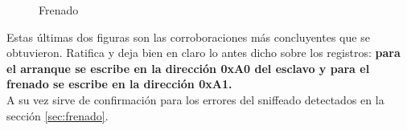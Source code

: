 \documentclass[main]{subfiles}
\begin{document}
\begin{figure} [h!]
\centering
  \caption{Frenado}
  \label{fig:MSP_frenado}
\end{figure}

Estas \'ultimas dos figuras son las corroboraciones m\'as concluyentes que se obtuvieron. Ratifica y deja bien en claro lo antes dicho sobre los registros: \textbf{para el arranque se escribe en la direcci\'on 0xA0 del esclavo y para el frenado se escribe en la direcci\'on 0xA1.}\\

A su vez sirve de confirmaci\'on para los errores del sniffeado detectados en la secci\'on \ref{sec:frenado}.
\end{document}
